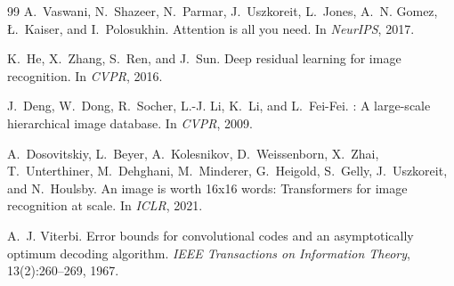 \documentclass[10pt,twocolumn]{article}
\begin{document}
\begin{thebibliography}{99}
A.~Vaswani, N.~Shazeer, N.~Parmar, J.~Uszkoreit, L.~Jones, A.~N. Gomez, \L.~Kaiser, and I.~Polosukhin.
\newblock Attention is all you need.
\newblock In \emph{NeurIPS}, 2017.

K.~He, X.~Zhang, S.~Ren, and J.~Sun.
\newblock Deep residual learning for image recognition.
\newblock In \emph{CVPR}, 2016.

J.~Deng, W.~Dong, R.~Socher, L.-J. Li, K.~Li, and L.~Fei-Fei.
: A large-scale hierarchical image database.
\newblock In \emph{CVPR}, 2009.

A.~Dosovitskiy, L.~Beyer, A.~Kolesnikov, D.~Weissenborn, X.~Zhai, T.~Unterthiner, M.~Dehghani, M.~Minderer, G.~Heigold, S.~Gelly, J.~Uszkoreit, and N.~Houlsby.
\newblock An image is worth 16x16 words: Transformers for image recognition at scale.
\newblock In \emph{ICLR}, 2021.

A.~J. Viterbi.
\newblock Error bounds for convolutional codes and an asymptotically optimum decoding algorithm.
\newblock \emph{IEEE Transactions on Information Theory}, 13(2):260--269, 1967.

\end{thebibliography}
\end{document}
